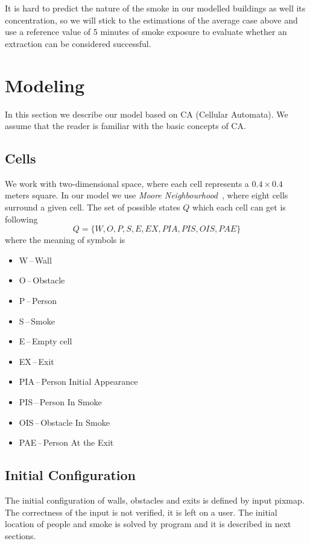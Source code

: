 It is hard to predict the nature of the smoke in our modelled buildings as well
its concentration, so we will stick to the estimations of the average case
above and use a reference value of 5 minutes of smoke exposure to evaluate
whether an extraction can be considered successful.

\section{Modeling}

In this section we describe our model based on CA (Cellular Automata). We
assume that the reader is familiar with the basic concepts of CA.

\subsection{Cells}
We work with two-dimensional space, where each cell represents a $0.4 \times
0.4$ meters square. In our model we use \emph{Moore
Neighbourhood}~\cite{Moore}, where eight cells surround a given cell.
The set of possible states $Q$ which each cell can get is following
$$Q = \{W,O,P,S,E,EX,PIA,PIS,OIS,PAE\}$$ where the meaning of symbols
is
\begin{itemize}
    \item W\,--\,Wall
    \item O\,--\,Obstacle
    \item P\,--\,Person
    \item S\,--\,Smoke
    \item E\,--\,Empty cell
    \item EX\,--\,Exit
    \item PIA\,--\,Person Initial Appearance
    \item PIS\,--\,Person In Smoke
    \item OIS\,--\,Obstacle In Smoke
    \item PAE\,--\,Person At the Exit
\end{itemize}

\subsection{Initial Configuration}
The initial configuration of walls, obstacles and exits is defined by input
pixmap. The correctness  of the input is not verified, it is left on a user.
The initial location of people and smoke is solved by program and it is
described in next sections.

